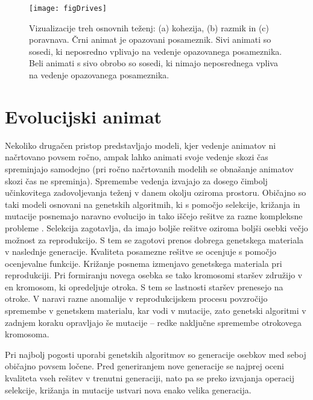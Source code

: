 \begin{razsirjeniPovzetek}
\begin{figure*}
	\texttt{[image: figDrives]}
	\caption{Vizualizacije treh osnovnih teženj: (a) kohezija, (b) razmik in (c) poravnava. Črni animat je opazovani posameznik. Sivi animati so sosedi, ki neposredno vplivajo na vedenje opazovanega posameznika. Beli animati s sivo obrobo so sosedi, ki nimajo neposrednega vpliva na vedenje opazovanega posameznika.}
	\label{fig:drives_si}
\end{figure*}

\section{Evolucijski animat}

Nekoliko drugačen pristop predstavljajo modeli, kjer vedenje animatov ni načrtovano povsem ročno, ampak lahko animati svoje vedenje skozi čas spreminjajo samodejno (pri ročno načrtovanih modelih se obnašanje animatov skozi čas ne spreminja). Spremembe vedenja izvajajo za dosego čimbolj učinkovitega zadovoljevanja teženj v danem okolju oziroma prostoru. Običajno so taki modeli osnovani na genetskih algoritmih, ki s pomočjo selekcije, križanja in mutacije posnemajo naravno evolucijo in tako iščejo rešitve za razne kompleksne probleme \cite{goldberg1989genetic,goldberg2002design,holland1992adaptation}. Selekcija zagotavlja, da imajo boljše rešitve oziroma boljši osebki večjo možnost za reprodukcijo. S tem se zagotovi prenos dobrega genetskega materiala v naslednje generacije. Kvaliteta posamezne rešitve se ocenjuje s pomočjo ocenjevalne funkcije. Križanje posnema izmenjavo genetskega materiala pri reprodukciji. Pri formiranju novega osebka se tako kromosomi staršev združijo v en kromosom, ki opredeljuje otroka. S tem se lastnosti staršev prenesejo na otroke. V naravi razne anomalije v reprodukcijskem procesu povzročijo spremembe v genetskem materialu, kar vodi v mutacije, zato genetski algoritmi v zadnjem koraku opravljajo še mutacije -- redke naključne spremembe otrokovega kromosoma. 

Pri najbolj pogosti uporabi genetskih algoritmov so generacije osebkov med seboj običajno povsem ločene. Pred generiranjem nove generacije se najprej oceni kvaliteta vseh rešitev v trenutni generaciji, nato pa se preko izvajanja operacij selekcije, križanja in mutacije ustvari nova enako velika generacija.


\end{razsirjeniPovzetek}
